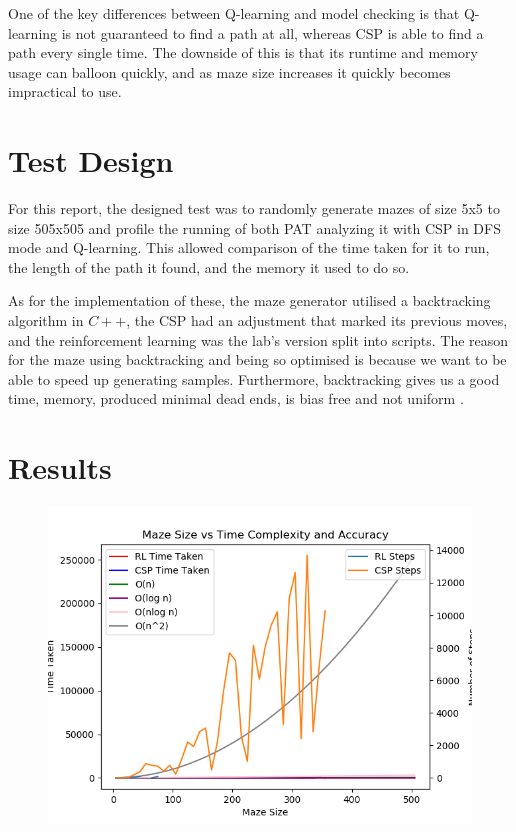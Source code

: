\documentclass{article}
\newcommand\tab[1][1cm]{\hspace*{#1}}
\begin{document}
        \tab One of the key differences between Q-learning and model checking is 
        that Q-learning is not guaranteed to find a path at all, whereas CSP 
        is able to find a path every single time. The downside of this is 
        that its runtime and memory usage can balloon quickly, and as maze 
        size increases it quickly becomes impractical to use.

    \section{Test Design}\label{sec:test-design}
        For this report, the designed test was to randomly generate mazes of 
        size 5x5 to size 505x505 and profile the running of both PAT analyzing 
        it with CSP in DFS mode and Q-learning. This allowed comparison of 
        the time taken for it to run, the length of the path it found, and 
        the memory it used to do so.

        \tab As for the implementation of these, the maze generator utilised a
        backtracking algorithm in $C++$, the CSP had an adjustment that marked its
        previous moves, and the reinforcement learning was the lab's version
        split into scripts. The reason for the maze using backtracking and being
        so optimised is because we want to be able to speed up generating
        samples. Furthermore, backtracking gives us a good time, memory,
        produced minimal dead ends, is bias free and not uniform 
        \cite{source}.

    \newpage
    \section{Results}\label{sec:results}

        \begin{table}[ht!]
            \resizebox{\textwidth}{!}{
                
            }
        \end{table}
        \newpage

        \begin{figure}[h]
            \centering
            \includegraphics[scale=0.6]{assets/TimeAndSteps.png}
            \label{TimeAndSteps}
        \end{figure}
\end{document}
